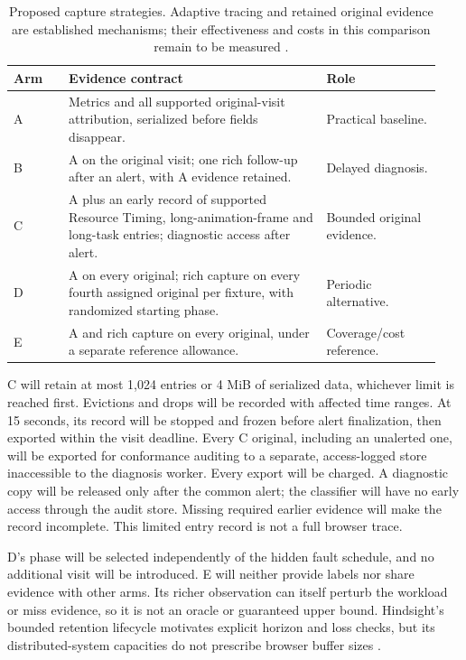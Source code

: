 \begin{table}[htbp]
\centering
\setlength{\tabcolsep}{3pt}
\caption{Proposed capture strategies. Adaptive tracing and retained original evidence are established mechanisms; their effectiveness and costs in this comparison remain to be measured \parencite{A3SS4UWX,3ED3FDXH,TIIDVPV8,BUPGR8ZJ,N33VTKAN}.}
\label{tab:arms}
\begin{tabular}{p{0.12\linewidth}p{0.57\linewidth}p{0.25\linewidth}}
\toprule
Arm & Evidence contract & Role \\
\midrule
A & Metrics and all supported original-visit attribution, serialized before fields disappear. & Practical baseline. \\
B & A on the original visit; one rich follow-up after an alert, with A evidence retained. & Delayed diagnosis. \\
C & A plus an early record of supported Resource Timing, long-animation-frame and long-task entries; diagnostic access after alert. & Bounded original evidence. \\
D & A on every original; rich capture on every fourth assigned original per fixture, with randomized starting phase. & Periodic alternative. \\
E & A and rich capture on every original, under a separate reference allowance. & Coverage/cost reference. \\
\bottomrule
\end{tabular}
\end{table}

C will retain at most 1,024 entries or 4 MiB of serialized data, whichever limit is reached first. Evictions and drops will be recorded with affected time ranges. At 15 seconds, its record will be stopped and frozen before alert finalization, then exported within the visit deadline. Every C original, including an unalerted one, will be exported for conformance auditing to a separate, access-logged store inaccessible to the diagnosis worker. Every export will be charged. A diagnostic copy will be released only after the common alert; the classifier will have no early access through the audit store. Missing required earlier evidence will make the record incomplete. This limited entry record is not a full browser trace.

D's phase will be selected independently of the hidden fault schedule, and no additional visit will be introduced. E will neither provide labels nor share evidence with other arms. Its richer observation can itself perturb the workload or miss evidence, so it is not an oracle or guaranteed upper bound. Hindsight's bounded retention lifecycle motivates explicit horizon and loss checks, but its distributed-system capacities do not prescribe browser buffer sizes \parencite{3ED3FDXH,REP5RHB6}.

